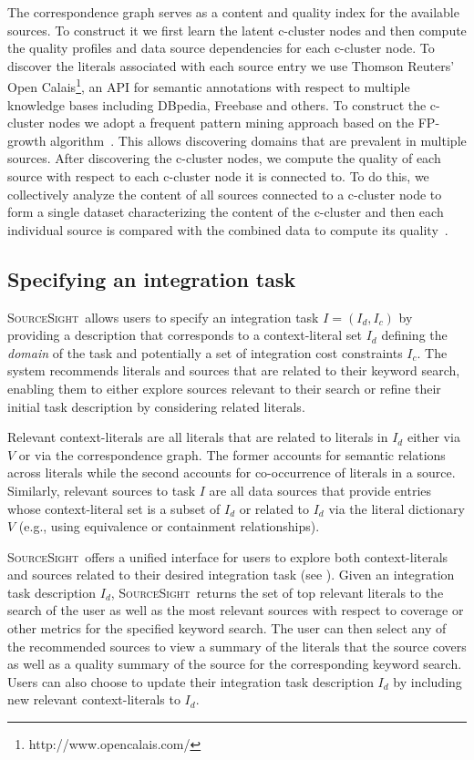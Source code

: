 \documentclass{sig-alternate-05-2015}
\newcommand\system{\textsc{SourceSight}}
\begin{document}
The correspondence graph serves as a content and quality index for the available sources. To construct it we first learn the latent c-cluster nodes and then compute the quality profiles and data source dependencies for each c-cluster node. To discover the literals associated with each source entry we use Thomson Reuters' Open Calais\footnote{http://www.opencalais.com/}, an API for semantic annotations with respect to multiple knowledge bases including DBpedia, Freebase and others. To construct the c-cluster nodes we adopt a frequent pattern mining approach based on the FP-growth algorithm~\cite{Han:2000}. This allows discovering domains that are prevalent in multiple sources. After discovering the c-cluster nodes, we compute the quality of each source with respect to each c-cluster node it is connected to. To do this, we collectively analyze the content of all sources connected to a c-cluster node to form a single dataset characterizing the content of the c-cluster and then each individual source is compared with the combined data to compute its quality~\cite{rekatsinas:2015}. 

\subsection{Specifying an integration task}
\label{sec:integtask}
\system~allows users to specify an integration task $I = (I_d, I_c)$ by providing a description that corresponds to a context-literal set $I_d$ defining the {\em domain} of the task and potentially a set of integration cost constraints $I_c$. The system recommends literals and sources that are related to their keyword search, enabling them to either explore sources relevant to their search or refine their initial task description by considering related literals.

Relevant context-literals are all literals that are related to literals in $I_d$ either via $V$ or via the correspondence graph. The former accounts for semantic relations across literals while the second accounts for co-occurrence of literals in a source. Similarly, relevant sources to task $I$ are all data sources that provide entries whose context-literal set is a subset of $I_d$ or related to $I_d$ via the literal dictionary $V$ (e.g., using equivalence or containment relationships). 

\system~offers a unified interface for users to explore both context-literals and sources related to their desired integration task (see ). Given an integration task description $I_d$, \system~returns the set of top relevant literals to the search of the user as well as the most relevant sources with respect to coverage or other metrics for the specified keyword search. The user can then select any of the recommended sources to view a summary of the literals that the source covers as well as a quality summary of the source for the corresponding keyword search. Users can also choose to update their integration task description $I_d$ by including new relevant context-literals to $I_d$.
\end{document}
